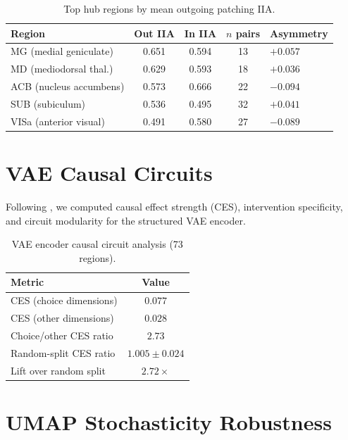 \documentclass{article}
\begin{document}
\begin{table}[h]
\centering
\small
\caption{Top hub regions by mean outgoing patching IIA.}
\label{tab:hubs}
\begin{tabular}{@{}lcccl@{}}
\toprule
\textbf{Region} & \textbf{Out IIA} & \textbf{In IIA} & \textbf{$n$ pairs} & \textbf{Asymmetry} \\
\midrule
MG (medial geniculate) & 0.651 & 0.594 & 13 & $+0.057$ \\
MD (mediodorsal thal.) & 0.629 & 0.593 & 18 & $+0.036$ \\
ACB (nucleus accumbens) & 0.573 & 0.666 & 22 & $-0.094$ \\
SUB (subiculum) & 0.536 & 0.495 & 32 & $+0.041$ \\
VISa (anterior visual) & 0.491 & 0.580 & 27 & $-0.089$ \\
\bottomrule
\end{tabular}
\end{table}


\section{VAE Causal Circuits}
\label{app:circuits}

Following \citet{martinez2025vae_circuits}, we computed causal effect strength (CES), intervention specificity, and circuit modularity for the structured VAE encoder.

\begin{table}[h]
\centering
\small
\caption{VAE encoder causal circuit analysis (73 regions).}
\label{tab:circuits}
\begin{tabular}{@{}lc@{}}
\toprule
\textbf{Metric} & \textbf{Value} \\
\midrule
CES (choice dimensions) & $0.077$ \\
CES (other dimensions) & $0.028$ \\
Choice/other CES ratio & $\mathbf{2.73}$ \\
Random-split CES ratio & $1.005 \pm 0.024$ \\
Lift over random split & $2.72\times$ \\
\bottomrule
\end{tabular}
\end{table}


\section{UMAP Stochasticity Robustness}
\label{app:umap}
\end{document}
